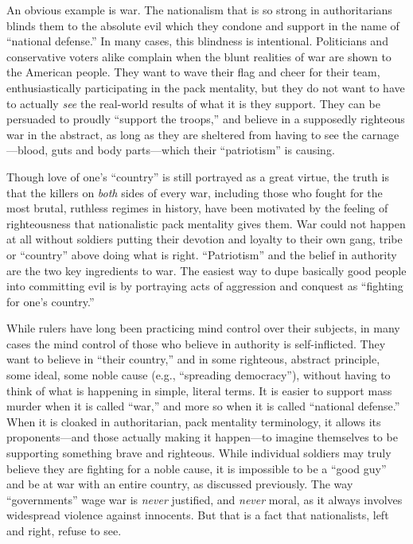 \documentclass{book}
\begin{document}
An obvious example is war. The nationalism that is so strong in authoritarians blinds them to the absolute evil which they condone and support in the name of \enquote{national defense.} In many cases, this blindness is intentional. Politicians and conservative voters alike complain when the blunt realities of war are shown to the American people. They want to wave their flag and cheer for their team, enthusiastically participating in the pack mentality, but they do not want to have to actually \emph{see} the real-world results of what it is they support. They can be persuaded to proudly \enquote{support the troops,} and believe in a supposedly righteous war in the abstract, as long as they are sheltered from having to see the carnage---blood, guts and body parts---which their \enquote{patriotism} is causing.

Though love of one's \enquote{country} is still portrayed as a great virtue, the truth is that the killers on \emph{both} sides of every war, including those who fought for the most brutal, ruthless regimes in history, have been motivated by the feeling of righteousness that nationalistic pack mentality gives them. War could not happen at all without soldiers putting their devotion and loyalty to their own gang, tribe or \enquote{country} above doing what is right. \enquote{Patriotism} and the belief in authority are the two key ingredients to war. The easiest way to dupe basically good people into committing evil is by portraying acts of aggression and conquest as \enquote{fighting for one's country.}

While rulers have long been practicing mind control over their subjects, in many cases the mind control of those who believe in authority is self-inflicted. They want to believe in \enquote{their country,} and in some righteous, abstract principle, some ideal, some noble cause (e.g., \enquote{spreading democracy}), without having to think of what is happening in simple, literal terms. It is easier to support mass murder when it is called \enquote{war,} and more so when it is called \enquote{national defense.} When it is cloaked in authoritarian, pack mentality terminology, it allows its proponents---and those actually making it happen---to imagine themselves to be supporting something brave and righteous. While individual soldiers may truly believe they are fighting for a noble cause, it is impossible to be a \enquote{good guy} and be at war with an entire country, as discussed previously. The way \enquote{governments} wage war is \emph{never} justified, and \emph{never} moral, as it always involves widespread violence against innocents. But that is a fact that nationalists, left and right, refuse to see.
\end{document}

